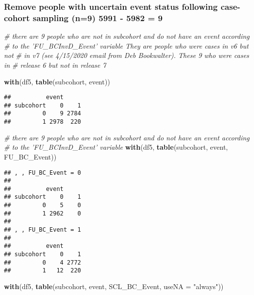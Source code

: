 \documentclass[
]{article}
\newenvironment{Shaded}{\begin{snugshade}}{\end{snugshade}}
\newcommand{\CommentTok}[1]{\textcolor[rgb]{0.56,0.35,0.01}{\textit{#1}}}
\newcommand{\DataTypeTok}[1]{\textcolor[rgb]{0.13,0.29,0.53}{#1}}
\newcommand{\KeywordTok}[1]{\textcolor[rgb]{0.13,0.29,0.53}{\textbf{#1}}}
\newcommand{\NormalTok}[1]{#1}
\newcommand{\StringTok}[1]{\textcolor[rgb]{0.31,0.60,0.02}{#1}}
\begin{document}
\hypertarget{remove-people-with-uncertain-event-status-following-case-cohort-sampling-n9-5991---5982-9}{%
\subsubsection{Remove people with uncertain event status following
case-cohort sampling (n=9) 5991 - 5982 =
9}\label{remove-people-with-uncertain-event-status-following-case-cohort-sampling-n9-5991---5982-9}}

\begin{Shaded}
\begin{Highlighting}[]
\CommentTok{# there are 9 people who are not in subcohort and do not have an event according}
\CommentTok{# to the 'FU_BCInvD_Event' variable They are people who were cases in v6 but not}
\CommentTok{# in v7 (see 4/15/2020 email from Deb Bookwalter).  These 9 who were cases in}
\CommentTok{# release 6 but not in release 7}

\KeywordTok{with}\NormalTok{(df5, }\KeywordTok{table}\NormalTok{(subcohort, event))}
\end{Highlighting}
\end{Shaded}

\begin{verbatim}
##          event
## subcohort    0    1
##         0    9 2784
##         1 2978  220
\end{verbatim}

\begin{Shaded}
\begin{Highlighting}[]
\CommentTok{# there are 9 people who are not in subcohort and do not have an event according}
\CommentTok{# to the 'FU_BCInvD_Event' variable}
\KeywordTok{with}\NormalTok{(df5, }\KeywordTok{table}\NormalTok{(subcohort, event, FU_BC_Event))}
\end{Highlighting}
\end{Shaded}

\begin{verbatim}
## , , FU_BC_Event = 0
## 
##          event
## subcohort    0    1
##         0    5    0
##         1 2962    0
## 
## , , FU_BC_Event = 1
## 
##          event
## subcohort    0    1
##         0    4 2772
##         1   12  220
\end{verbatim}

\begin{Shaded}
\begin{Highlighting}[]
\KeywordTok{with}\NormalTok{(df5, }\KeywordTok{table}\NormalTok{(subcohort, event, SCL_BC_Event, }\DataTypeTok{useNA =} \StringTok{"always"}\NormalTok{))}
\end{Highlighting}
\end{Shaded}
\end{document}
